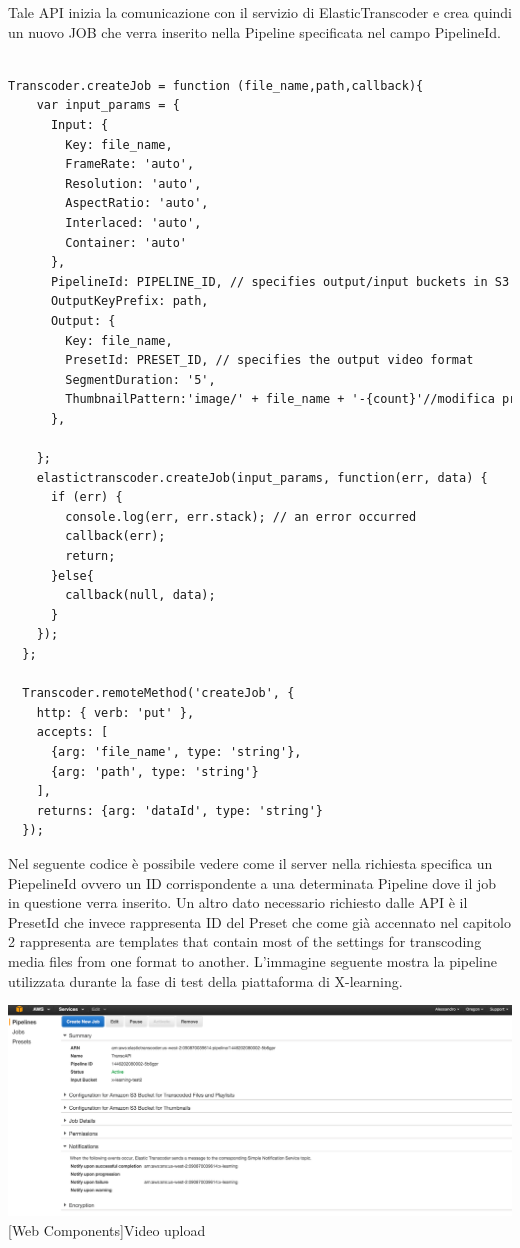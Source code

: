  Tale API inizia la comunicazione con il servizio di ElasticTranscoder e crea quindi un nuovo JOB che verra inserito nella Pipeline specificata nel campo PipelineId.
\begin{lstlisting}[language=html]
  
Transcoder.createJob = function (file_name,path,callback){
    var input_params = {
      Input: { 
        Key: file_name, 
        FrameRate: 'auto', 
        Resolution: 'auto', 
        AspectRatio: 'auto', 
        Interlaced: 'auto', 
        Container: 'auto' 
      }, 
      PipelineId: PIPELINE_ID, // specifies output/input buckets in S3 
      OutputKeyPrefix: path,
      Output: { 
        Key: file_name, 
        PresetId: PRESET_ID, // specifies the output video format
        SegmentDuration: '5',
        ThumbnailPattern:'image/' + file_name + '-{count}'//modifica preset per determinare il numero di immagini
      },

    };    
    elastictranscoder.createJob(input_params, function(err, data) {
      if (err) {
        console.log(err, err.stack); // an error occurred
        callback(err);
        return;
      }else{
        callback(null, data);
      }
    });
  };
  
  Transcoder.remoteMethod('createJob', {
    http: { verb: 'put' },
    accepts: [
      {arg: 'file_name', type: 'string'},
      {arg: 'path', type: 'string'}
    ],
    returns: {arg: 'dataId', type: 'string'}
  });
\end{lstlisting}

Nel seguente codice è possibile vedere come il server nella richiesta specifica un PiepelineId ovvero un ID corrispondente a una determinata Pipeline dove il job in questione verra inserito.
Un altro dato necessario richiesto dalle API è il PresetId che invece rappresenta ID del Preset che come già accennato nel capitolo 2 rappresenta are templates that contain most of the settings for transcoding media files from one format to another.
L’immagine seguente mostra la pipeline utilizzata durante la fase di test della piattaforma di X-learning.


\begin{minipage}{\linewidth}
    \centering
    \includegraphics[width=1.0\linewidth]{images/chapter6/elastic_pipeline.png}
    [Web Components]{Video upload}
\end{minipage}


